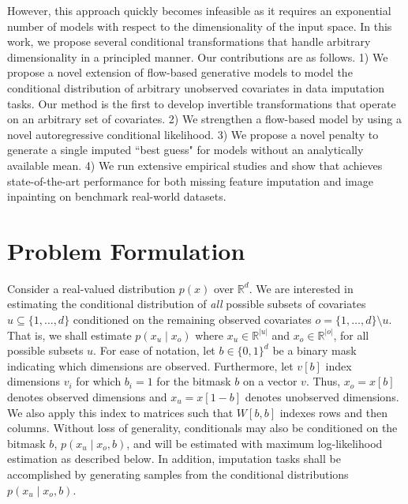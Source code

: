 \documentclass[letterpaper]{article} %
\begin{document}
However, this approach quickly becomes infeasible as it requires an exponential number of models with respect to the dimensionality of the input space.
In this work, we propose several conditional transformations that handle arbitrary dimensionality in a principled manner.
Our contributions are as follows. 1) We propose a novel extension of flow-based generative models to model the conditional distribution of arbitrary unobserved covariates in data imputation tasks. Our method is the first to develop invertible transformations that operate on an arbitrary set of covariates. 2) We strengthen a flow-based model by using a novel autoregressive conditional likelihood. 3) We propose a novel penalty to generate a single imputed ``best guess" for models without an analytically available mean. 4) We run extensive empirical studies and show that achieves state-of-the-art performance for both missing feature imputation and image inpainting on benchmark real-world datasets. 
\section{Problem Formulation}
Consider a real-valued distribution $p(x)$ over $\mathbb{R}^d$.
We are interested in estimating the conditional distribution of \emph{all} possible subsets of covariates $u \subseteq \{1, \ldots, d\}$ conditioned on the remaining observed covariates $o = \{1, \ldots, d\} \setminus u$. That is, we shall estimate $p(x_u \mid x_o)$ where $x_u \in \mathbb{R}^{|u|}$ and $x_o \in \mathbb{R}^{|o|}$, for all possible subsets $u$.
For ease of notation, let $b \in \{0, 1\}^d$ be a binary mask  indicating which dimensions are observed.
Furthermore, let $v[b]$ index dimensions $v_i$ for which $b_i = 1$ for the bitmask $b$ on a vector $v$. Thus, $x_o=x\left[b\right]$ denotes observed dimensions and $x_u = x\left[1-b\right]$ denotes unobserved dimensions. 
We also apply this index to matrices such that $W[b, b]$ indexes rows and then columns.
Without loss of generality, conditionals may also be conditioned on the bitmask $b$, $p(x_u \mid x_o, b)$, and will be estimated with maximum log-likelihood estimation as described below. In addition, imputation tasks shall be accomplished by generating samples from the conditional distributions $p(x_u \mid x_o, b)$.
\end{document}
